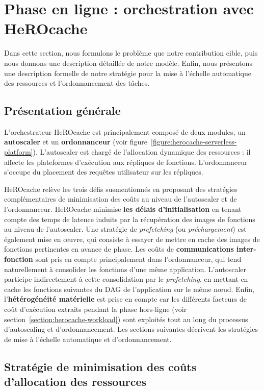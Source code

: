 {\section{Phase en ligne : orchestration avec HeROcache} \label{section:herocache-contribution}

Dans cette section, nous formulons le problème que notre contribution cible, puis nous donnons une description détaillée de notre modèle. Enfin, nous présentons une description formelle de notre stratégie pour la mise à l'échelle automatique des ressources et l'ordonnancement des tâches.

\subsection{Présentation générale}

L'orchestrateur HeROcache est principalement composé de deux modules, un \textbf{autoscaler} et un \textbf{ordonnanceur} (voir figure~\ref{figure:herocache-serverless-platform}). L'autoscaler est chargé de l'allocation dynamique des ressources : il affecte les plateformes d'exécution aux répliques de fonctions. L'ordonnanceur s'occupe du placement des requêtes utilisateur sur les répliques.

HeROcache relève les trois défis susmentionnés en proposant des stratégies complémentaires de minimisation des coûts au niveau de l'autoscaler et de l'ordonnanceur. HeROcache minimise \textbf{les délais d'initialisation} en tenant compte des temps de latence induits par la récupération des images de fonctions au niveau de l'autoscaler. Une stratégie de \textit{prefetching} (ou \textit{préchargement}) est également mise en œuvre, qui consiste à essayer de mettre en cache des images de fonctions pertinentes en avance de phase. Les coûts de \textbf{communications inter-fonction} sont pris en compte principalement dans l'ordonnanceur, qui tend naturellement à consolider les fonctions d'une même application. L'autoscaler participe indirectement à cette consolidation par le \textit{prefetching}, en mettant en cache les fonctions suivantes du DAG de l'application sur le même nœud. Enfin, l'\textbf{hétérogénéité matérielle} est prise en compte car les différents facteurs de coût d'exécution extraits pendant la phase hors-ligne (voir section~\ref{section:herocache-workload}) sont exploités tout au long du processus d'autoscaling et d'ordonnancement. Les sections suivantes décrivent les stratégies de mise à l'échelle automatique et d'ordonnancement.

\subsection{Stratégie de minimisation des coûts d'allocation des ressources}

}
